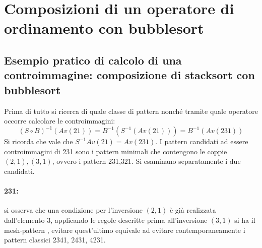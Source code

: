 \section{Composizioni di un operatore di ordinamento con bubblesort}
\subsection{Esempio pratico di calcolo di una controimmagine: composizione di stacksort con bubblesort}
Prima di tutto si ricerca di quale classe di pattern nonch\'e tramite quale operatore occorre calcolare le controimmagini:
$$(S\circ B)^{-1}(Av(21)) = B^{-1}(S^{-1}(Av(21)))=B^{-1}(Av(231))$$
Si ricorda che vale che $S^{-1}Av(21) = Av(231)$.
I pattern candidati ad essere controimmagini di 231 sono i pattern minimali che contengono le coppie $(2,1),(3,1)$, ovvero i pattern 231,321. Si esaminano separatamente i due candidati.
\paragraph*{231:} si osserva che una condizione per l'inversione $(2,1)$ \`e gi\`a realizzata dall'elemento $3$, applicando le regole descritte prima all'inversione $(3,1)$ si ha il mesh-pattern , evitare quest'ultimo equivale ad evitare contemporaneamente i pattern classici 2341, 2431, 4231.
